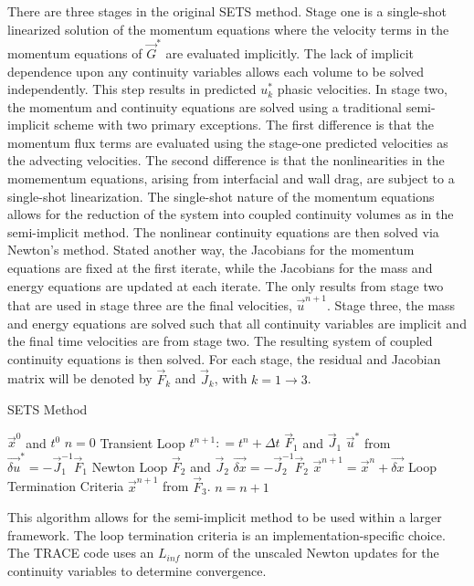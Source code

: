 There are three stages in the original SETS method.
Stage one is a single-shot linearized solution of the momentum equations where the velocity terms in the momentum equations of $\vec{G}^{*}$ are evaluated implicitly.
The lack of implicit dependence upon any continuity variables allows each volume to be solved independently.
This step results in predicted $u^{*}_{k}$ phasic velocities.
In stage two, the momentum and continuity equations are solved using a traditional semi-implicit scheme with two primary exceptions.
The first difference is that the momentum flux terms are evaluated using the stage-one predicted velocities as the advecting velocities.
The second difference is that the nonlinearities in the momementum equations, arising from interfacial and wall drag, are subject to a single-shot linearization.
The single-shot nature of the momentum equations allows for the reduction of the system into coupled continuity volumes as in the semi-implicit method.
The nonlinear continuity equations are then solved via Newton's method.
Stated another way, the Jacobians for the momentum equations are fixed at the first iterate, while the Jacobians for the mass and energy equations are updated at each iterate.
The only results from stage two that are used in stage three are the final velocities, $\vec{u}^{n+1}$.
Stage three, the mass and energy equations are solved such that all continuity variables are implicit and the final time velocities are from stage two.
The resulting system of coupled continuity equations is then solved.
For each stage, the residual and Jacobian matrix will be denoted by $\vec{F}_k$ and $\vec{J}_k$, with $k = 1 \to 3$.

\begin{algo}[H]
\caption{SETS Method}
\label{alg:sets}
\setlength{\baselineskip}{0.625\baselineskip}
\begin{algorithmic}[1]
\Require $\vec{x}^{0}$ and $t^{0}$
\Set $n = 0$
\Loop \; Transient Loop
    \State $t^{n+1} : = t^{n} + \Delta t$
	\Calculate $\vec{F}_1$ and $\vec{J}_1$
	\Calculate $\vec{u}^{*}$ from $\vec{\delta u}^{*} = -\vec{J}^{-1}_1\vec{F}_1$
	\Loop \; Newton Loop
		\Calculate $\vec{F}_2$ and $\vec{J}_2$
		\BlackBox $\vec{\delta x} = - \vec{J}_2^{-1}\vec{F}_2$
		\Calculate $\vec{x}^{n+1} = \vec{x}^{n} + \vec{\delta x}$
		\BlackBox Loop Termination Criteria
	\EndLoop
	\Calculate $\vec{x}^{n+1}$ from $\vec{F}_3$.
	\State $n = n + 1$
\EndLoop
\end{algorithmic}
\end{algo}

This algorithm allows for the semi-implicit method to be used within a larger framework.
The loop termination criteria is an implementation-specific choice.
The TRACE code uses an $L_{inf}$ norm of the unscaled Newton updates for the continuity variables to determine convergence.

